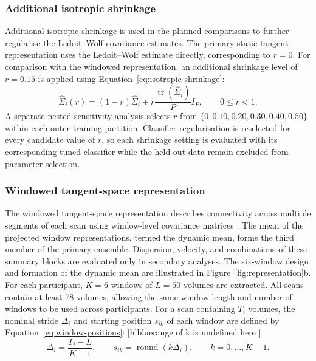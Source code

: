\subsubsection{Additional isotropic shrinkage}
\label{subsubsec:isotropic-shrinkage}

Additional isotropic shrinkage is used in the planned comparisons to further regularise the
Ledoit--Wolf covariance estimates. The primary static tangent representation uses the
Ledoit--Wolf estimate directly, corresponding to $r=0$. For comparison with the windowed
representation, an additional shrinkage level of $r=0.15$ is applied using
Equation~\eqref{eq:isotropic-shrinkage}:
\begin{equation}
\widehat{\Sigma}_i(r)
=
(1-r)\widehat{\Sigma}_i
+
r\frac{\operatorname{tr}(\widehat{\Sigma}_i)}{P}I_P,
\qquad 0 \leq r < 1.
\label{eq:isotropic-shrinkage}
\end{equation}
A separate nested sensitivity analysis selects $r$ from
$\{0,0.10,0.20,0.30,0.40,0.50\}$ within each outer training partition. Classifier
regularisation is reselected for every candidate value of $r$, so each shrinkage setting
is evaluated with its corresponding tuned classifier while the held-out data remain
excluded from parameter selection.

\subsubsection{Windowed tangent-space representation}
\label{subsubsec:windowed-representation}

The windowed tangent-space representation describes connectivity across multiple segments of each scan using window-level covariance matrices \citep{Hutchisonetal2013,Allenetal2014,LeonardiVanDeVille2015,Pretietal2017}. The mean of the projected window representations, termed the dynamic mean, forms the third member of the primary ensemble. Dispersion, velocity, and combinations of these summary blocks are evaluated only in secondary analyses. The six-window design and formation of the dynamic mean are illustrated in Figure~\ref{fig:representation}b. For each participant, $K=6$ windows of $L=50$ volumes are extracted. All scans contain at least 78 volumes, allowing the same window length and number of windows to be used across participants. For a scan containing $T_i$ volumes, the nominal stride $\Delta_i$ and starting position $s_{ik}$ of each window are defined by Equation~\eqref{eq:window-positions}:  [hlblue{range of k is undefined here }]
\begin{equation}
\Delta_i
=
\frac{T_i-L}{K-1},
\qquad
s_{ik}
=
\operatorname{round}(k\Delta_i),
\qquad
k=0,\ldots,K-1.
\label{eq:window-positions}
\end{equation}

